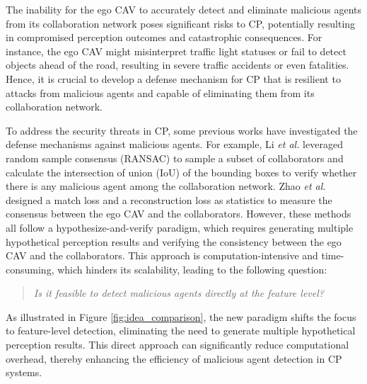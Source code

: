 The inability for the ego CAV to accurately detect and eliminate malicious agents from its collaboration network poses significant risks to CP, potentially resulting in compromised perception outcomes and catastrophic consequences. 
For instance, the ego CAV might misinterpret traffic light statuses or fail to detect objects ahead of the road, resulting in severe traffic accidents or even fatalities. Hence, it is crucial to develop a defense mechanism for CP that is resilient to attacks from malicious agents and capable of eliminating them from its collaboration network.



To address the security threats in CP, some previous works have investigated the defense mechanisms against malicious agents. For example, Li \textit{et al.} \citep{liUsAdversariallyRobust2023} leveraged random sample consensus (RANSAC) to sample a subset of collaborators and calculate the intersection of union (IoU) of the bounding boxes to verify whether there is any malicious agent among the collaboration network. Zhao \textit{et al.} \citep{zhaoMaliciousAgentDetection2024} designed a match loss and a reconstruction loss as statistics to measure the consensus between the ego CAV and the collaborators. 
However, these methods all follow a hypothesize-and-verify paradigm, which requires generating multiple hypothetical perception results and verifying the consistency between the ego CAV and the collaborators.
This approach is computation-intensive and time-consuming, which hinders its scalability, leading to the following question:
\begin{quote}
    \centering
    \textit{Is it feasible to detect malicious agents directly at the feature level?}
\end{quote}
As illustrated in Figure \ref{fig:idea_comparison}, the new paradigm shifts the focus to feature-level detection, eliminating the need to generate multiple hypothetical perception results. This direct approach can significantly reduce computational overhead, thereby enhancing the efficiency of malicious agent detection in CP systems.

